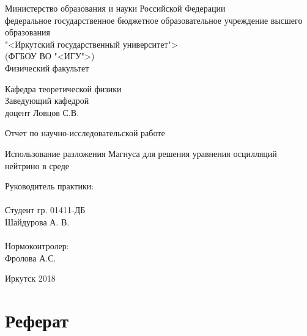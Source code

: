 \documentclass[12pt]{article}
\numberwithin{equation}{section}
\begin{document}
\pagestyle{empty}
\fontsize{14}{17pt} \selectfont
\begin{titlepage}
\begin{center}
{Министерство образования и науки Российской Федерации\\[5pt]}
{федеральное государственное бюджетное образовательное учреждение высшего образования \\[5pt]}
{"<Иркутский государственный университет">\\[5pt]}
{(ФГБОУ ВО "<ИГУ">)\\[5pt]}
Физический факультет \\[35pt]
\begin{flushright}
Кафедра теоретической физики\\
Заведующий кафедрой\\
доцент Ловцов С.В. \underline{\qquad\qquad\qquad}\\[35pt]
\end{flushright}
\Large {Отчет по научно-исследовательской работе\\[20pt]}

{\Large Использование разложения Магнуса для решения уравнения осцилляций нейтрино в среде}\\[6pt]
\bigskip
\end{center}
\begin{flushright}
\begin{minipage}[bf]{8cm}
Руководитель практики:\\[5pt]
\underline{\qquad\qquad\quad\quad} \mbox{} \\
Студент гр. 01411-ДБ\\[5pt]
\underline{\qquad\qquad\qquad\qquad}  Шайдурова А. В. \\
\mbox{}\\
Нормоконтролер:\\
\underline{\qquad\qquad\qquad\qquad} Фролова А.С.\\
\end{minipage}
\bigskip
\end{flushright}

\begin{center}
	Иркутск 2018
\end{center}
\end{titlepage}
\newpage
\section*{\large Реферат}
\newpage
\begin{center}
	{\large \mdseries \tableofcontents}
\end{center}
\newpage
\end{document}
